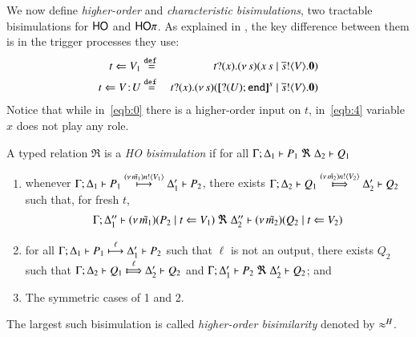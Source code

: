 \smallskip 

 We now define 
\emph{higher-order} 
and
\emph{characteristic
bisimulations}, 
two tractable bisimulations for $\mathsf{HO}$ and $\mathsf{HO}\pi$.
As explained in ,
the key difference between them is in the 
trigger processes they use:
\begin{eqnarray}
\htrigger{t}{V_1}  & \defeq &  \hotrigger{t}{V} \label{eqb:0} \\
	\ftrigger{t}{V}{U} & \defeq &  \fotrigger{t}{x}{s}{\btinp{U} \tinact}{V} 	\label{eqb:4}
\end{eqnarray}
\noi
Notice that while 
in~\eqref{eqb:0} there is a higher-order input on $t$, 
in~\eqref{eqb:4} variable $x$ does not play any role.

\smallskip 

\begin{definition}\rm
	\label{d:hbw}
A typed relation $\Re$ is a {\em  HO bisimulation} if 
for all $\horel{\Gamma}{\Delta_1}{P_1}{\ \Re \ }{\Delta_2}{Q_1}$ 
\begin{enumerate}[1)]
\item 
whenever 
$\Gamma; \Delta_1 \vdash P_1 \stackrel{(\nu\, \tilde{m_1}) n ! \langle V_1 \rangle}{\longmapsto} \Delta_1' \vdash P_2$, there exists 
$\horel{\Gamma}{\Delta_2}{Q_1}{\Hby{\news{\tilde{m_2}} \bactout{n}{V_2}}}{\Delta_2'}{Q_2}$ such that, for fresh $t$, 
\[
\begin{array}{lrlll}
\Gamma; \Delta''_1  \vdash  {(\nu\, \tilde{m_1})(P_2 \;|\;t \Leftarrow V_1)}
\ \Re 
\ \Delta''_2 \vdash {(\nu\, \tilde{m_2})(Q_2 \;|\;t \Leftarrow V_2)}
\end{array}
\]
		\item	
for all $\Gamma; \Delta_1 \vdash P_1 \stackrel{\ell}{\longmapsto} \Delta_1' \vdash P_2$ such that 
$\ell$ is not an output, 
 there exists $Q_2$ such that 
$\horel{\Gamma}{\Delta_2}{Q_1}{\Hby{\ell}}{\Delta_2'}{Q_2}$
			and
			$\horel{\Gamma}{\Delta_1'}{P_2}{\ \Re \ }{\Delta_2'}{Q_2}$; and 

                      \item	The symmetric cases of 1 and 2.                
	\end{enumerate}
	The largest such bisimulation
	is called \emph{higher-order bisimilarity}  denoted by $\approx^H$.
\end{definition}

\smallskip 

